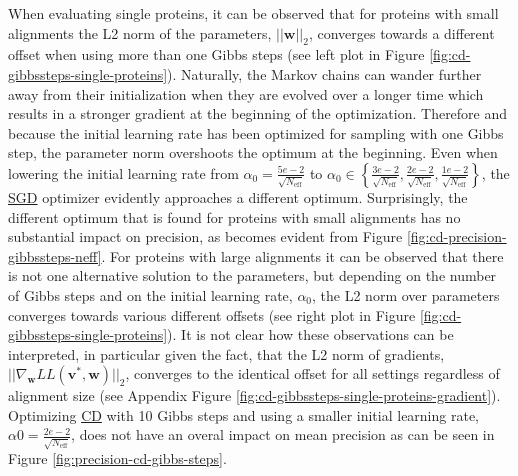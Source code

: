 \documentclass[11pt,a4paper,twoside]{book}
\renewcommand{\v}{\mathbf{v}}
\newcommand{\w}{\mathbf{w}}
\theoremstyle{definition}
\theoremstyle{definition}
\theoremstyle{remark}
\begin{document}
When evaluating single proteins, it can be observed that for proteins
with small alignments the L2 norm of the parameters, \(||\w||_2\),
converges towards a different offset when using more than one Gibbs
steps (see left plot in Figure \ref{fig:cd-gibbssteps-single-proteins}).
Naturally, the Markov chains can wander further away from their
initialization when they are evolved over a longer time which results in
a stronger gradient at the beginning of the optimization. Therefore and
because the initial learning rate has been optimized for sampling with
one Gibbs step, the parameter norm overshoots the optimum at the
beginning. Even when lowering the initial learning rate from
\(\alpha_0 = \frac{5e-2}{\sqrt{N_{\text{eff}}}}\) to
\(\alpha_0 \in \left \{ \frac{3e-2}{\sqrt{N_{\text{eff}}}}, \frac{2e-2}{\sqrt{N_{\text{eff}}}} , \frac{1e-2}{\sqrt{N_{\text{eff}}}} \right \}\),
the \protect\hyperlink{abbrev}{SGD} optimizer evidently approaches a
different optimum. Surprisingly, the different optimum that is found for
proteins with small alignments has no substantial impact on precision,
as becomes evident from Figure \ref{fig:cd-precision-gibbssteps-neff}.
For proteins with large alignments it can be observed that there is not
one alternative solution to the parameters, but depending on the number
of Gibbs steps and on the initial learning rate, \(\alpha_0\), the L2
norm over parameters converges towards various different offsets (see
right plot in Figure \ref{fig:cd-gibbssteps-single-proteins}). It is not
clear how these observations can be interpreted, in particular given the
fact, that the L2 norm of gradients,
\(||\nabla_{\w} L\!L(\v^*, \w)||_2\), converges to the identical offset
for all settings regardless of alignment size (see Appendix Figure
\ref{fig:cd-gibbssteps-single-proteins-gradient}). Optimizing
\protect\hyperlink{abbrev}{CD} with 10 Gibbs steps and using a smaller
initial learning rate, \(\alpha0 = \frac{2e-2}{\sqrt{N_{\text{eff}}}}\),
does not have an overal impact on mean precision as can be seen in
Figure \ref{fig:precision-cd-gibbs-steps}.
\end{document}
